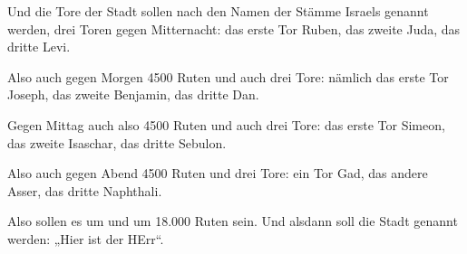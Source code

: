  Und die Tore der Stadt sollen nach den Namen der Stämme
Israels genannt werden, drei Toren gegen Mitternacht: das erste Tor
Ruben, das zweite Juda, das dritte Levi.

 Also auch gegen Morgen 4500 Ruten und auch drei Tore:
nämlich das erste Tor Joseph, das zweite Benjamin, das dritte Dan.

 Gegen Mittag auch also 4500 Ruten und auch drei Tore: das
erste Tor Simeon, das zweite Isaschar, das dritte Sebulon.

 Also auch gegen Abend 4500 Ruten und drei Tore: ein Tor
Gad, das andere Asser, das dritte Naphthali.

 Also sollen es um und um 18.000 Ruten sein. Und alsdann
soll die Stadt genannt werden: „Hier ist der HErr``.
